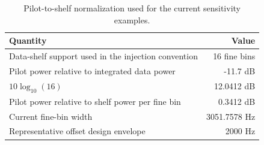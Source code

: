 \begin{table}[ht]
\centering
\caption{Pilot-to-shelf normalization used for the current sensitivity examples.}
\label{tab:pilot-normalization}
\begin{tabular}{l r}
\toprule
Quantity & Value \\
\midrule
Data-shelf support used in the injection convention & 16 fine bins \\
Pilot power relative to integrated data power & -11.7 dB \\
$10\log_{10}(16)$ & 12.0412 dB \\
Pilot power relative to shelf power per fine bin & 0.3412 dB \\
Current fine-bin width & 3051.7578 Hz \\
Representative offset design envelope & 2000 Hz \\
\bottomrule
\end{tabular}
\end{table}